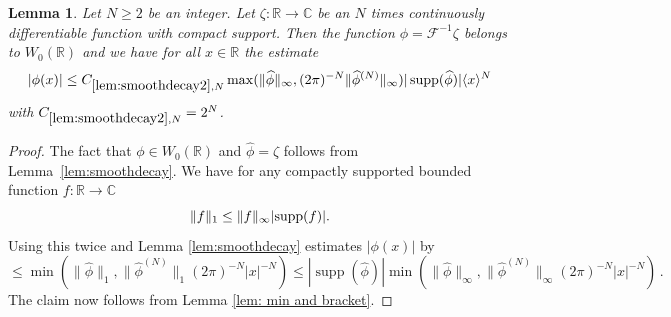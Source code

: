 \documentclass[12pt,reqno]{amsart}
\theoremstyle{plain}
\newtheorem{lemma}[theorem]{Lemma}
\numberwithin{equation}{section}
\theoremstyle{remark}
\newcommand{\uses}[1]{}
\newcommand{\usesdefs}[1]{}
\newcommand{\R}{{\mathbb R}}
\newcommand{\C}{{\mathbb C}}
\DeclareMathOperator{\supp}{supp}
\newcommand{\ct}[1]{{\color{magenta}{[C: #1]}}}
\newcommand{\jr}[1]{{\color{orange}{[J: #1]}}}
\begin{document}
\ct{I strengthened the following lemma by a factor $(2\pi)^N$ and improving the cosnatnt by a factor 2. The constant need no name, $2^N$ is shorter than the name.}\jr{I think the factor was probably omitted on purpose to simplify terms, see comment below}
\begin{lemma}
   \label{lem:smoothdecay2}\uses{lem:smoothdecay,lem: min and bracket}\usesdefs{bracket bump,auto:Wiener-space-definition}
Let $N\geq 2$ be an integer. Let $\zeta:\R\to\C$ be an $N$ times continuously differentiable function with compact support.
Then the function $\phi=\mathcal F^{-1} \zeta$ belongs to $W_0(\R)$ and we have for all $x\in \R$ the estimate
\begin{equation}\label{E:smoothdecay2}
|\phi(x)|\leq C_{\ref{lem:smoothdecay2}, N} \max(\|\widehat{\phi}\|_\infty, (2\pi )^{-N}\|\widehat{\phi}^{(N)}\|_\infty)|\supp (\widehat{\phi})|   \langle x\rangle^{N}
\end{equation}
with $C_{\ref{lem:smoothdecay2}, N}=2^{N} $.
\end{lemma}


\begin{proof}
The fact that $\phi \in W_0(\R)$ and $\widehat{\phi}=\zeta$ follows from Lemma~\ref{lem:smoothdecay}.
We have for any compactly supported bounded function $f:\R\to\C$
  \[\|f\|_1 \le \|f\|_\infty |\textup{supp}(f)| .\]
Using this twice and Lemma \ref{lem:smoothdecay} estimates $|\phi(x)|$ by
\[\le \min(\|\widehat{\phi}\|_1, \|\widehat{\phi}^{(N)}\|_1 (2\pi)^{-N} |x|^{-N})
\le |\supp (\widehat{\phi})| \min(\|\widehat{\phi}\|_\infty, \|\widehat{\phi}^{(N)}\|_\infty (2\pi)^{-N} |x|^{-N})\, . \]
  The claim now follows from Lemma \ref{lem: min and bracket}.
\end{proof}
\end{document}
